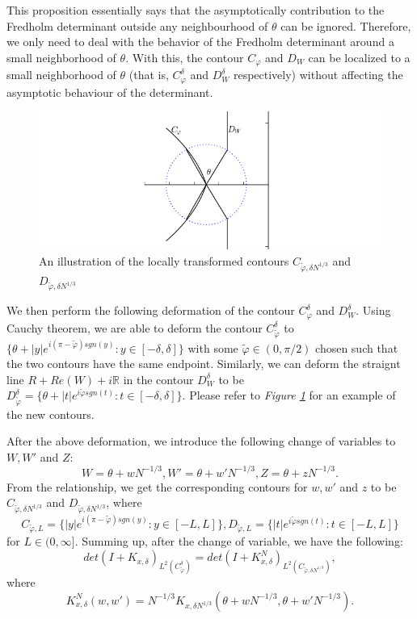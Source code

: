 This proposition essentially says that the asymptotically contribution to the Fredholm determinant outside any neighbourhood of $\theta$ can be ignored. Therefore, we only need to deal with the behavior of the Fredholm determinant around a small neighborhood of $\theta$. With this, the contour $C_{\varphi}$ and $D_{W}$ can be localized to a small neighborhood of $\theta$ (that is, $C_{\varphi}^{\delta}$ and $D_{W}^{\delta}$ respectively) without affecting the asymptotic behaviour of the determinant.

\begin{figure}
	\centering
	\includegraphics[width=\textwidth]{contour-localization}
	\caption[Contour localization and transformation of $C_{\varphi}$ and $D_W$]
	{An illustration of the locally transformed contours $C_{\tilde{\varphi},\delta N^{1/3}}$ and $D_{\tilde{\varphi}, \delta N^{1/3}}$}
	\label{fig:contour-second-replacement}
\end{figure}

We then perform the following deformation of the contour $C_{\varphi}^{\delta}$ and $D_W^{\delta}$. Using Cauchy theorem, we are able to deform the contour $C_{\tilde{\varphi}}^{\delta}$ to $\{\theta + |y|e^{i(\pi - \tilde{\varphi}) sgn(y)}: y \in [-\delta, \delta]\}$ with some $\tilde{\varphi} \in (0, \pi / 2)$ chosen such that the two contours have the same endpoint. Similarly, we can deform the straignt line $R+Re(W) + i \mathbb{R}$ in the contour $D_W^{\delta}$ to be $D_{\tilde{\varphi}}^{\delta} = \{\theta + |t| e^{i \tilde{\varphi} sgn(t)}: t \in [-\delta, \delta] \}$. Please refer to \textit{Figure \ref{fig:contour-second-replacement}} for an example of the new contours.

After the above deformation, we introduce the following change of variables to $W, W'$ and $Z$: $$W = \theta + wN^{-1/3}, W' = \theta + w' N^{-1/3}, Z = \theta + zN^{-1/3}.$$ From the relationship, we get the corresponding contours for $w, w'$ and $z$ to be $C_{\tilde{\varphi},\delta N^{1/3}}$ and $D_{\tilde{\varphi}, \delta N^{1/3}}$, where
$$C_{\tilde{\varphi},L} = \{|y|e^{i(\pi - \tilde{\varphi}) sgn(y)}: y \in [-L, L]\}, D_{\tilde{\varphi}, L} = \{|t| e^{i \tilde{\varphi} sgn(t)}: t \in [-L, L]\}$$ for $L \in (0, \infty].$ Summing up, after the change of variable, we have the following: $$det(I+K_{x, \delta})_{L^2(C_{\tilde{\varphi}}^{\delta})} = det(I +K_{x, \delta}^N )_{L^2(C_{\tilde{\varphi}, \delta N^{1/3}})},$$ where 
\begin{equation}
\label{rescaled-kernel}
K_{x, \delta}^N(w,w') = N^{-1/3} K_{x, \delta N^{1/3}} (\theta + wN^{-1/3}, \theta + w'N^{-1/3}).
\end{equation}


